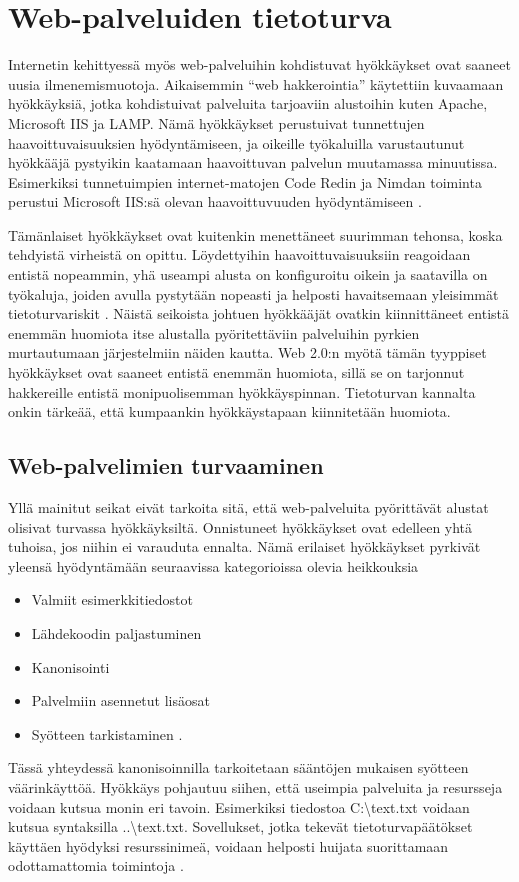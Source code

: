 \section{Web-palveluiden tietoturva}

Internetin kehittyessä myös web-palveluihin kohdistuvat hyökkäykset ovat saaneet
uusia ilmenemismuotoja. Aikaisemmin ``web hakkerointia'' käytettiin kuvaamaan
hyökkäyksiä, jotka kohdistuivat palveluita tarjoaviin alustoihin kuten Apache, 
Microsoft IIS ja LAMP. Nämä hyökkäykset perustuivat tunnettujen haavoittuvaisuuksien
hyödyntämiseen, ja oikeille työkaluilla varustautunut hyökkääjä pystyikin kaatamaan haavoittuvan
palvelun muutamassa minuutissa. Esimerkiksi tunnetuimpien internet-matojen Code Redin ja Nimdan toiminta
perustui Microsoft IIS:sä olevan haavoittuvuuden hyödyntämiseen \cite{Hacking}. 

Tämänlaiset hyökkäykset ovat kuitenkin
menettäneet suurimman tehonsa, koska tehdyistä virheistä on opittu. Löydettyihin haavoittuvaisuuksiin
reagoidaan entistä nopeammin, yhä useampi alusta on konfiguroitu oikein ja saatavilla on työkaluja, joiden
avulla pystytään nopeasti ja helposti havaitsemaan yleisimmät tietoturvariskit \cite{Hacking}. Näistä seikoista johtuen
hyökkääjät ovatkin kiinnittäneet entistä enemmän huomiota itse alustalla pyöritettäviin palveluihin pyrkien 
murtautumaan järjestelmiin näiden kautta. Web 2.0:n myötä tämän tyyppiset hyökkäykset ovat saaneet entistä
enemmän huomiota, sillä se on tarjonnut hakkereille entistä monipuolisemman hyökkäyspinnan. Tietoturvan 
kannalta onkin tärkeää, että kumpaankin hyökkäystapaan kiinnitetään huomiota.

\subsection{Web-palvelimien turvaaminen}

Yllä mainitut seikat eivät tarkoita sitä, että web-palveluita pyörittävät alustat olisivat
turvassa hyökkäyksiltä. Onnistuneet hyökkäykset ovat edelleen yhtä tuhoisa, jos niihin ei varauduta ennalta.
Nämä erilaiset hyökkäykset pyrkivät yleensä hyödyntämään seuraavissa kategorioissa olevia heikkouksia

\begin{itemize}
\item Valmiit esimerkkitiedostot
\item Lähdekoodin paljastuminen
\item Kanonisointi
\item Palvelmiin asennetut lisäosat
\item Syötteen tarkistaminen \cite{Hacking}.
\end{itemize}
Tässä yhteydessä kanonisoinnilla tarkoitetaan sääntöjen mukaisen syötteen väärinkäyttöä. Hyökkäys pohjautuu siihen,
että useimpia palveluita ja resursseja voidaan kutsua monin eri tavoin. Esimerkiksi tiedostoa C:\textbackslash text.txt voidaan 
kutsua syntaksilla ..\textbackslash text.txt. Sovellukset, jotka tekevät tietoturvapäätökset käyttäen hyödyksi resurssinimeä,
voidaan helposti huijata suorittamaan odottamattomia toimintoja \cite{Hacking}.

